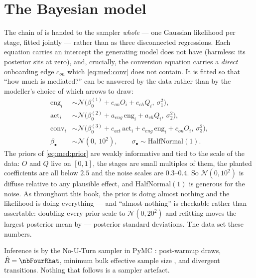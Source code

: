 \section{The Bayesian model}
\label{sec:med:bayes}

The chain of  is handed to the sampler \emph{whole} --- one
Gaussian likelihood per stage, fitted jointly --- rather than as three disconnected regressions.
Each equation carries an intercept the generating model does not have (harmless: its posterior sits
at zero), and, crucially, the conversion equation carries a \emph{direct} onboarding edge $c_{on}$
which \cref{eq:med:conv} does not contain. It is fitted so that ``how much is mediated?'' can be
answered by the data rather than by the modeller's choice of which arrows to draw:
%
\begin{align}
  \text{eng}_i &\sim \mathcal N\big(\beta_0^{(1)} + e_{on}O_i + e_{ch}Q_i,\ \sigma_1^2\big),
    \label{eq:med:lik1}\\
  \text{act}_i &\sim \mathcal N\big(\beta_0^{(2)} + a_{eng}\,\text{eng}_i + a_{ch}Q_i,\
    \sigma_2^2\big), \label{eq:med:lik2}\\
  \text{conv}_i &\sim \mathcal N\big(\beta_0^{(3)} + c_{act}\,\text{act}_i
    + c_{eng}\,\text{eng}_i + c_{on}O_i,\ \sigma_3^2\big), \label{eq:med:lik3}\\
  \beta_\bullet &\sim \mathcal N(0,\ 10^2), \qquad
  \sigma_\bullet \sim \text{HalfNormal}(1). \label{eq:med:prior}
\end{align}
%
The priors of \cref{eq:med:prior} are weakly informative and tied to the scale of the data: $O$ and
$Q$ live on $[0,1]$, the stages are small multiples of them, the planted coefficients are all below
$2.5$ and the noise scales are $0.3$--$0.4$. So $\mathcal N(0, 10^2)$ is diffuse relative to any
plausible effect, and $\text{HalfNormal}(1)$ is generous for the noise. As throughout this book, the
prior is doing almost nothing and the likelihood is doing everything --- and ``almost nothing'' is
checkable rather than assertable: doubling every prior scale to $\mathcal N(0, 20^2)$ and refitting
moves the largest posterior mean by \nbFourPriorShift{} --- \nbFourPriorShiftSd{} posterior standard
deviations. The data set these numbers.

Inference is by the No-U-Turn sampler \citep{hoffman2014} in PyMC \citep{salvatier2016}:
\nbFourNDraws{} post-warmup draws, $\hat R = \nbFourRhat$, minimum bulk effective sample size
\nbFourEss{} \citep{vehtari2021}, and \nbFourDivergences{} divergent transitions. Nothing that
follows is a sampler artefact.

